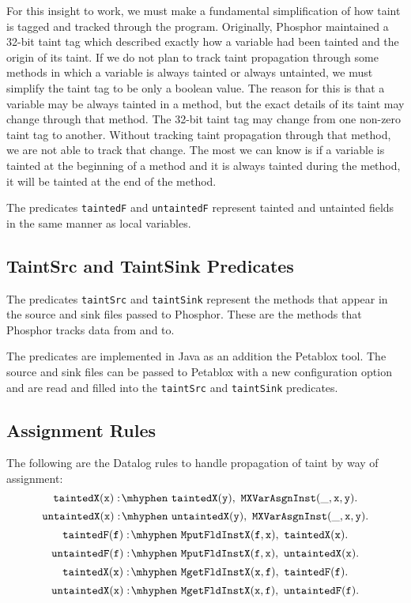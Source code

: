 For this insight to work, we must make a fundamental simplification of how taint is tagged and tracked through the program. Originally, Phosphor maintained a 32-bit taint tag which described exactly how a variable had been tainted and the origin of its taint. If we do not plan to track taint propagation through some methods in which a variable is always tainted or always untainted, we must simplify the taint tag to be only a boolean value. The reason for this is that a variable may be always tainted in a method, but the exact details of its taint may change through that method. The 32-bit taint tag may change from one non-zero taint tag to another. Without tracking taint propagation through that method, we are not able to track that change. The most we can know is if a variable is tainted at the beginning of a method and it is always tainted during the method, it will be tainted at the end of the method.

The predicates \texttt{taintedF} and \texttt{untaintedF} represent tainted and untainted fields in the same manner as local variables.
\subsection{TaintSrc and TaintSink Predicates}
The predicates \texttt{taintSrc} and \texttt{taintSink} represent the methods that appear in the source and sink files passed to Phosphor. These are the methods that Phosphor tracks data from and to.

The predicates are implemented in Java as an addition the Petablox tool. The source and sink files can be passed to Petablox with a new configuration option and are read and filled into the \texttt{taintSrc} and \texttt{taintSink} predicates.
\subsection{Assignment Rules}
The following are the Datalog rules to handle propagation of taint by way of assignment:
\begin{equation}
  \mathtt{taintedX(x) \is taintedX(y) \also  MXVarAsgnInst(\_,x,y).}
\end{equation}
\begin{equation}
  \mathtt{untaintedX(x) \is untaintedX(y) \also MXVarAsgnInst(\_,x,y).}
\end{equation}
\begin{equation}
  \mathtt{taintedF(f) \is MputFldInstX(f,x) \also taintedX(x).}
\end{equation}
\begin{equation}
  \mathtt{untaintedF(f) \is MputFldInstX(f,x) \also untaintedX(x).}
\end{equation}
\begin{equation}
  \mathtt{taintedX(x) \is MgetFldInstX(x,f) \also taintedF(f).}
\end{equation}
\begin{equation}
  \mathtt{untaintedX(x) \is MgetFldInstX(x,f) \also untaintedF(f).}
\end{equation}

